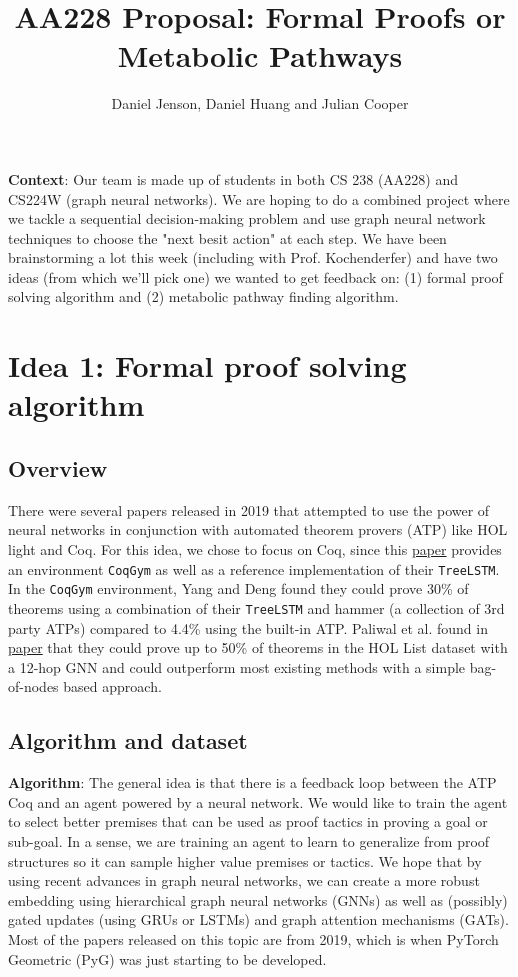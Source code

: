 \documentclass{article}
\title{%
    AA228 Proposal: Formal Proofs or Metabolic Pathways}
\author{Daniel Jenson, Daniel Huang and Julian Cooper}
\begin{document}
\maketitle

\textbf{Context}: Our team is made up of students in both CS 238 (AA228) and
CS224W (graph neural networks). We are hoping to do a combined project where we
tackle a sequential decision-making problem and use graph neural network
techniques to choose the "next besit action" at each step. We have been
brainstorming a lot this week (including with Prof. Kochenderfer) and have two
ideas (from which we'll pick one) we wanted to get feedback on: (1) formal
proof solving algorithm and (2) metabolic pathway finding algorithm. 

\section{Idea 1: Formal proof solving algorithm}
\subsection{Overview}
There were several papers released in 2019 that attempted to use the power of
neural networks in conjunction with automated theorem provers (ATP) like HOL
light and Coq. For this idea, we chose to focus on Coq, since this
\href{https://arxiv.org/abs/1905.09381}{paper} provides an environment
\texttt{CoqGym} as well as a reference implementation of their
\texttt{TreeLSTM}. In the \texttt{CoqGym} environment, Yang and Deng found they
could prove 30\% of theorems using a combination of their \texttt{TreeLSTM} and
hammer (a collection of 3rd party ATPs) compared to 4.4\% using the built-in
ATP.  Paliwal et al. found in \href{https://arxiv.org/abs/1905.10006}{paper}
that they could prove up to 50\% of theorems in the HOL List dataset with a
12-hop GNN and could outperform most existing methods with a simple
bag-of-nodes based approach.
\subsection{Algorithm and dataset}
\textbf{Algorithm}: The general idea is that there is a feedback loop between
the ATP Coq and an agent powered by a neural network. We would like to train
the agent to select better premises that can be used as proof tactics in
proving a goal or sub-goal. In a sense, we are training an agent to learn to
generalize from proof structures so it can sample higher value premises or
tactics. We hope that by using recent advances in graph neural networks, we can
create a more robust embedding using hierarchical graph neural networks (GNNs)
as well as (possibly) gated updates (using GRUs or LSTMs) and graph attention
mechanisms (GATs). Most of the papers released on this topic are from 2019,
which is when PyTorch Geometric (PyG) was just starting to be developed.
\end{document}
